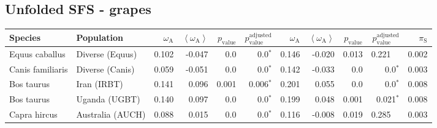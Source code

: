 \subsection{Unfolded SFS - grapes} 
\begin{center}
\begin{adjustbox}{width = 1\textwidth}
\begin{tabular}{|l|l|r|r|r|r|r|r|r|r|r|}
\toprule
             Species &                      Population & $\omega_{\mathrm{A}}$ & $\left< \omega_{\mathrm{A}} \right>$ & $p_{\mathrm{value}}$ & $p_{\mathrm{value}}^{\mathrm{adjusted}}$ & $\omega_{\mathrm{A}}$ & $\left< \omega_{\mathrm{A}} \right>$ & $p_{\mathrm{value}}$ & $p_{\mathrm{value}}^{\mathrm{adjusted}}$ & $\pi_{\textrm{S}}$ \\
\midrule
      Equus caballus &                 Diverse (Equus) &                 0.102 &                               -0.047 &                  0.0 &                             0.0$\bm{^*}$ &                 0.146 &                               -0.020 &                0.013 &                                  0.221~~ &              0.002 \\
    Canis familiaris &                 Diverse (Canis) &                 0.059 &                               -0.051 &                  0.0 &                             0.0$\bm{^*}$ &                 0.142 &                               -0.033 &                  0.0 &                             0.0$\bm{^*}$ &              0.003 \\
          Bos taurus &                     Iran (IRBT) &                 0.141 &                                0.096 &                0.001 &                           0.006$\bm{^*}$ &                 0.201 &                                0.055 &                  0.0 &                             0.0$\bm{^*}$ &              0.008 \\
          Bos taurus &                   Uganda (UGBT) &                 0.140 &                                0.097 &                  0.0 &                             0.0$\bm{^*}$ &                 0.199 &                                0.048 &                0.001 &                           0.021$\bm{^*}$ &              0.008 \\
        Capra hircus &                Australia (AUCH) &                 0.088 &                                0.015 &                  0.0 &                             0.0$\bm{^*}$ &                 0.116 &                               -0.008 &                0.019 &                                  0.285~~ &              0.003 \\

\end{tabular}
\end{adjustbox}
\end{center}
